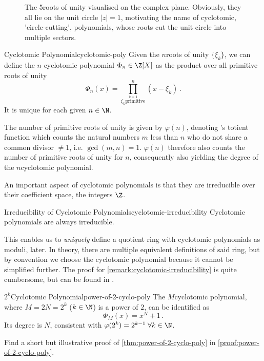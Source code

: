 \begin{figure}
  \centering
  \caption[The 5th roots of unity]{The 5\th roots of unity visualised on the complex plane. Obviously, they all lie on the unit circle $|z| = 1$, motivating the name of cyclotomic, 'circle-cutting', polynomials, whose roots cut the unit circle into multiple sectors.}
  \label{fig:nth-roots-of-unity}
\end{figure}

\begin{definition}{Cyclotomic Polynomial}{cyclotomic-poly}
  Given the $n$\th roots of unity $\{\xi_k\}$, we can define the $n$\th
  cyclotomic polynomial $\Phi_n \in \Z[X]$ as the product over all primitive roots of unity
  $$\Phi_n(x) = \prod_{\stackrel{k=1}{\xi_k \mathrm{primitive}}}^{n} (x - \xi_k) \,.$$
  It is unique for each given $n \in \N$.
\end{definition}
The number of primitive roots of unity is given by $\varphi(n)$, denoting 's totient function which counts the natural numbers $m$ less than $n$ who do not share a common divisor $\neq 1$, i.e. $\gcd(m, n) = 1$.
$\varphi(n)$ therefore also counts the number of primitive roots of unity for $n$, consequently also yielding the degree of the $n$\th cyclotomic polynomial.

An important aspect of cyclotomic polynomials is that they are irreducible over their coefficient space, the integers $\Z$.
\begin{remark}{Irreducibility of Cyclotomic Polynomials}{cyclotomic-irreducibility}
  Cyclotomic polynomials are always irreducible.
\end{remark}
This enables us to \textit{uniquely} define a quotient ring with cyclotomic polynomials as moduli, later.
In theory, there are multiple equivalent definitions of said ring, but by convention we choose the cyclotomic polynomial because it cannot be simplified further.
The proof for \cref{remark:cyclotomic-irreducibility} is quite cumbersome, but can be found in \cite{2002-serge-algebra}.

\begin{theorem}{$2^k$\th Cyclotomic Polynomial}{power-of-2-cyclo-poly}
  The $M$\th cyclotomic polynomial, where $M = 2N = 2^k$ ($k \in \N$) is a power of $2$, can be identified as
  $$\Phi_{M}(x) = x^{N} + 1\,.$$
  Its degree is $N$, consistent with $\varphi(2^k) = 2^{k-1} \; \forall k \in \N$.
\end{theorem}
Find a short but illustrative proof of \cref{thm:power-of-2-cyclo-poly} in \cref{proof:power-of-2-cyclo-poly}.

